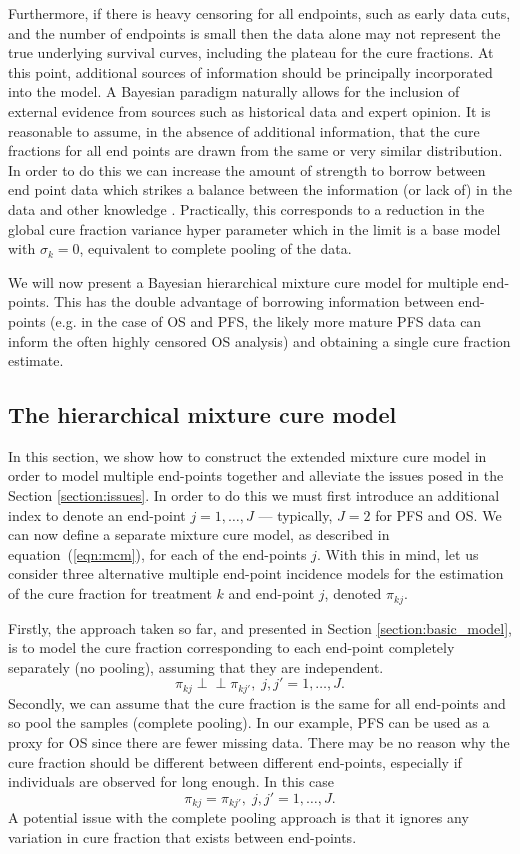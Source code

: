 \documentclass[AMA,STIX1COL]{WileyNJD-v2}
\begin{document}
Furthermore, if there is heavy censoring for all endpoints, such as early data cuts, and the number of endpoints is small then the data alone may not represent the true underlying survival curves, including the plateau for the cure fractions.
At this point, additional sources of information should be principally incorporated into the model. A Bayesian paradigm naturally allows for the inclusion of external evidence from sources such as historical data and expert opinion. It is reasonable to assume, in the absence of additional information, that the cure fractions for all end points are drawn from the same or very similar distribution. In order to do this we can increase the amount of strength to borrow between end point data which strikes a balance between the information (or lack of) in the data and other knowledge \cite{Nikolaidis2021}. Practically, this corresponds to a reduction in the global cure fraction variance hyper parameter which in the limit is a base model with $\sigma_k=0$, equivalent to complete pooling of the data. 

We will now present a Bayesian hierarchical mixture cure model for multiple end-points.
This has the double advantage of borrowing information between end-points
(e.g. in the case of OS and PFS, the likely more mature PFS data can inform the often highly censored OS analysis) and obtaining a single cure fraction estimate.

%
\subsection{The hierarchical mixture cure model} \label{section:hier_model}
In this section, we show how to construct the extended mixture cure model in order to model multiple end-points together and alleviate the issues posed in the Section \ref{section:issues}.
In order to do this we must first introduce an additional index to denote an end-point $j = 1, \ldots, J$ --- typically, $J=2$ for PFS and OS.
We can now define a separate mixture cure model, as described in equation~(\ref{eqn:mcm}), for each of the end-points $j$.
With this in mind, let us consider three alternative multiple end-point incidence models for the estimation of the cure fraction for treatment $k$ and end-point $j$, denoted $\pi_{kj}$.

Firstly, the approach taken so far, and presented in Section \ref{section:basic_model}, is to model the cure fraction corresponding to each end-point completely separately (no pooling), assuming that they are independent.
$$
\pi_{kj} \perp\!\!\!\perp \pi_{kj'}, \; j,j' = 1, \ldots, J.
$$
Secondly, we can assume that the cure fraction is the same for all end-points and so pool the samples (complete pooling).
In our example, PFS can be used as a proxy for OS since there are fewer missing data.
There may be no reason why the cure fraction should be different between different end-points, especially if individuals are observed for long enough.
In this case
$$
\pi_{kj} = \pi_{kj'}, \; j,j' = 1, \ldots, J.
$$
A potential issue with the complete pooling approach is that it ignores any variation in cure fraction that exists between end-points.
\end{document}
